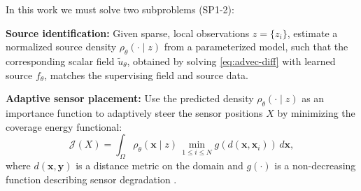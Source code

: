\documentclass[onefignum,onetabnum]{siamart171218} %
\begin{document}
In this work we must solve two subproblems (SP1-2):
\begin{hypobox}
\begin{SPenum}
    \item \label{sp:SP1} \textbf{Source identification:} Given sparse, local observations $z = \{z_i\}$, estimate a normalized source density $\rho_\theta(\cdot \mid z)$ from a parameterized model, such that the corresponding scalar field $\tilde{u}_\theta$, obtained by solving \eqref{eq:advec-diff} with learned source $f_\theta $, matches the supervising field and source data.
    \item \label{sp:SP2} \textbf{Adaptive sensor placement:} Use the predicted density $\rho_\theta(\cdot \mid z)$ as an importance function to adaptively steer the sensor positions $X$ by minimizing the coverage energy functional:
    \begin{equation}
        \label{eq:generic_J}
        \mathcal{J}(X) = \int_\Omega \rho_\theta(\mathbf{x} \mid z)\, \min_{1 \le i \le N} g(d(\mathbf{x}, \mathbf{x}_i)) \, d\mathbf{x},
    \end{equation}
    where $d(\mathbf{x}, \mathbf{y})$ is a distance metric on the domain and $g(\cdot)$ is a non-decreasing function describing sensor degradation \cite{cortes2004coverage}.
\end{SPenum}
\end{hypobox}

\end{document}

